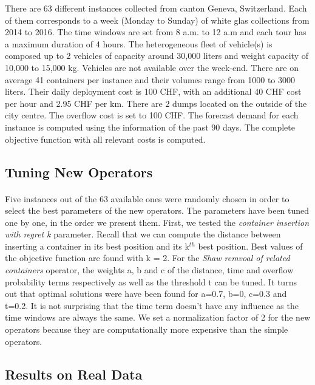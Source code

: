 \documentclass[12pt,a4paper]{article}
\begin{document}
There are 63 different instances collected from canton Geneva, Switzerland. Each of them corresponds to a week (Monday to Sunday) of white glas collections from 2014 to 2016. The time windows are set from 8 a.m. to 12 a.m and each tour has a maximum duration of 4 hours. The heterogeneous fleet of vehicle(s) is composed up to 2 vehicles of capacity around 30,000 liters and weight capacity of 10,000 to 15,000 kg. Vehicles are not available over the week-end. There are on average 41 containers per instance and their volumes range from 1000 to 3000 liters. Their daily deployment cost is 100 CHF, with an additional 40 CHF cost per hour and 2.95 CHF per km. There are 2 dumps located on the outside of the city centre. The overflow cost is set to 100 CHF. The forecast demand for each instance is computed using the information of the past 90 days. The complete objective function with all relevant costs is computed.

\subsection{Tuning New Operators}
\paragraph{}
Five instances out of the 63 available ones were randomly chosen in order to select the best parameters of the new operators. The parameters have been tuned one by one, in the order we present them. First, we tested the \textit{container insertion with regret k} parameter. Recall that we can compute the distance between inserting a container in its best position and its k$^{th}$ best position. Best values of the objective function are found with k = 2. For the \textit{Shaw remvoal of related containers} operator, the weights a, b and c of the distance, time and overflow probability terms respectively as well as the threshold t can be tuned. It turns out that optimal solutions were have been found for a=0.7, b=0, c=0.3 and t=0.2. It is not surprising that the time term doesn't have any influence as the time windows are always the same. We set a normalization factor of 2 for the new operators because they are computationally more expensive than the simple operators. 

\subsection{Results on Real Data}
\end{document}
